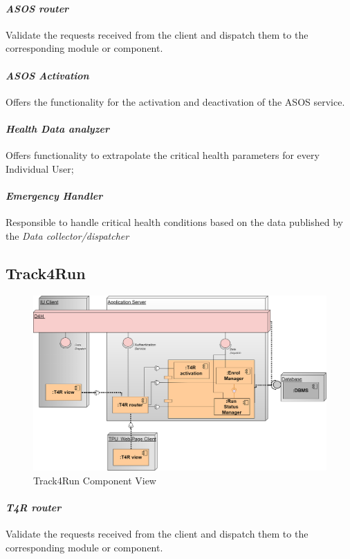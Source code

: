 \paragraph{\textit{ASOS router}} Validate the requests received from the client and dispatch them to the corresponding module or component.
\paragraph{\textit{ASOS Activation}} Offers the functionality for the activation and deactivation of the ASOS service.
\paragraph{\textit{Health Data analyzer}} Offers functionality to extrapolate the critical health parameters for every Individual User;
\paragraph{\textit{Emergency Handler}} Responsible to handle critical health conditions based on the data published by the \textit{Data collector/dispatcher}
\clearpage
\subsection{Track4Run}
\begin{figure}[H]
\caption{Track4Run Component View}
\centering
\includegraphics[width = \textwidth]{sections/architecturalDesign/T4RDiagram.png}
\end{figure}
\paragraph{\textit{T4R router}} Validate the requests received from the client and dispatch them to the corresponding module or component.
